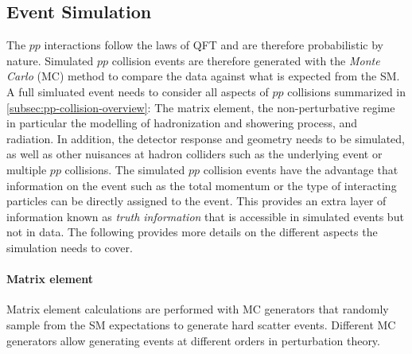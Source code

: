 \subsection{Event Simulation}
The $pp$ interactions follow the laws of QFT and are therefore probabilistic by nature.
Simulated $pp$ collision events are therefore generated with the \emph{Monte Carlo} (MC) method to compare the data against what is expected from the SM.
A full simluated event needs to consider all aspects of $pp$ collisions summarized in \cref{subsec:pp-collision-overview}: The matrix element, the non-perturbative regime in particular the modelling of hadronization and showering process, and radiation. In addition, the detector response and geometry needs to be simulated, as well as other nuisances at hadron colliders such as the underlying event or multiple $pp$ collisions.
The simulated $pp$ collision events have the advantage that information on the event such as the total momentum or the type of interacting particles can be directly assigned to the event. This provides an extra layer of information known as \emph{truth information} that is accessible in simulated events but not in data.
The following provides more details on the different aspects the simulation needs to cover.


\paragraph{Matrix element}
Matrix element calculations are performed with MC generators that randomly sample from the SM expectations to generate hard scatter events. Different MC generators allow generating events at different orders in perturbation theory. 
